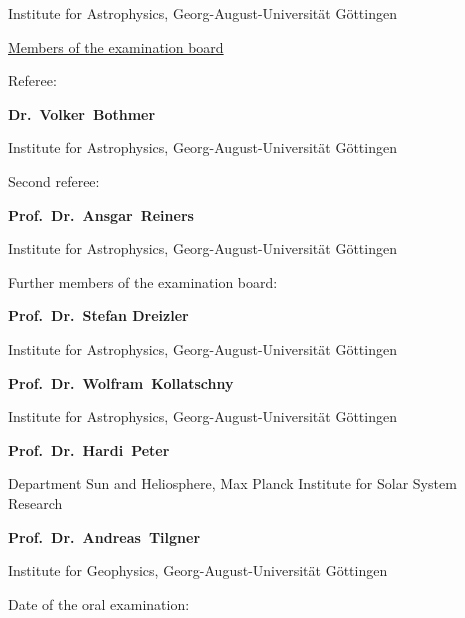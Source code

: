 Institute for Astrophysics, Georg-August-Universität Göttingen
% 
\vspace{3\baselineskip}

\noindent \underline{Members of the examination board}
\vspace{\baselineskip}

\noindent Referee:
\medskip

\textbf{Dr.~Volker~Bothmer}

Institute for Astrophysics, Georg-August-Universität Göttingen
\vspace{\baselineskip}

\noindent Second referee:
\medskip

\textbf{Prof.~Dr.~Ansgar~Reiners}

Institute for Astrophysics, Georg-August-Universität Göttingen
% 
% 
\vspace{\baselineskip}

\noindent Further members of the examination board:
\medskip

\textbf{Prof.~Dr.~Stefan Dreizler}

Institute for Astrophysics, Georg-August-Universität Göttingen
\vspace{\baselineskip}

\textbf{Prof.~Dr.~Wolfram~Kollatschny}

Institute for Astrophysics, Georg-August-Universität Göttingen
\vspace{\baselineskip}

\textbf{Prof.~Dr.~Hardi~Peter}

Department Sun and Heliosphere, Max Planck Institute for Solar System Research
\vspace{\baselineskip}

\textbf{Prof.~Dr.~Andreas~Tilgner}

Institute for Geophysics, Georg-August-Universität Göttingen
\vspace{3\baselineskip}

\noindent Date of the oral examination: \underline{\hspace{3cm}}

\vfill

\cleardoublepage


